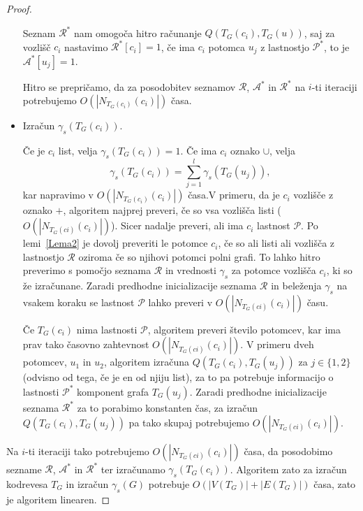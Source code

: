 \documentclass[12pt,a4paper,twoside]{article}
\theoremstyle{definition} %
\theoremstyle{plain} %
\numberwithin{equation}{section}  %
\begin{document}
\begin{proof}
\begin{itemize}
Seznam $\mathcal{R^*}$ nam omogoča hitro računanje $Q(T_G(c_i), T_G(u))$, saj za vozlišč $c_i$ nastavimo $\mathcal{R^*}[c_i] = 1$, če ima $c_i$ potomca $u_j$ z lastnostjo $\mathcal{P^*}$, to je $\mathcal{A^*}[u_j] = 1$.

Hitro se prepričamo, da za posodobitev seznamov $\mathcal{R}$, $\mathcal{A^*}$ in $\mathcal{R^*}$ na $i$-ti iteraciji potrebujemo $O(|N_{T_G(c_i)}(c_i)|)$ časa.

\item Izračun $\gamma_s(T_G(c_i))$.

Če je $c_i$ list, velja $\gamma_s(T_G(c_i)) = 1$. Če ima $c_i$ oznako $\cup$, velja $$\gamma_s(T_G(c_i)) = \sum\limits_{j=1}^l \gamma_s(T_G(u_j)),$$ kar napravimo v $O(|N_{T_G(c_i)}(c_i)|)$ časa.V primeru, da je $c_i$ vozlišče z oznako $+$, algoritem najprej preveri, če so vsa vozlišča listi ($O(|N_{T_G(ci)}(c_i)|)$). Sicer nadalje preveri, ali ima $c_i$ lastnost $\mathcal{P}$. Po lemi~\ref{Lema2} je dovolj preveriti le potomce $c_i$, če so ali listi ali vozlišča z lastnostjo $\mathcal{R}$ oziroma če so njihovi potomci polni grafi. To lahko hitro preverimo s pomočjo seznama $\mathcal{R}$ in vrednosti $\gamma_s$ za potomce vozlišča $c_i$, ki so že izračunane. Zaradi predhodne inicializacije seznama $\mathcal{R}$ in beleženja $\gamma_s$ na vsakem koraku se lastnost $\mathcal{P}$ lahko preveri v $O(|N_{T_G(ci)}(c_i)|)$ času.

Če $T_G(c_i)$ nima lastnosti $\mathcal{P}$, algoritem preveri število potomcev, kar ima prav tako časovno zahtevnost $O(|N_{T_G(ci)}(c_i)|)$. V primeru dveh potomcev, $u_1$ in $u_2$, algoritem izračuna $Q(T_G(c_i), T_G(u_j))$ za $j \in \{1, 2\}$ (odvisno od tega, če je en od njiju list), za to pa potrebuje informacijo o lastnosti $\mathcal{P^*}$ komponent grafa $T_G(u_j)$. Zaradi predhodne inicializacije seznama $\mathcal{R^*}$ za to porabimo konstanten čas, za izračun $Q(T_G(c_i), T_G(u_j))$ pa tako skupaj potrebujemo  $O(|N_{T_G(ci)}(c_i)|)$. 
\end{itemize}
Na $i$-ti iteraciji tako potrebujemo $O(|N_{T_G(ci)}(c_i)|)$ časa, da posodobimo sezname $\mathcal{R}$, $\mathcal{A^*}$ in $\mathcal{R^*}$ ter izračunamo $\gamma_s(T_G(c_i))$. Algoritem zato za izračun kodrevesa $T_G$ in izračun $\gamma_s(G)$  potrebuje $O(|V(T_G)| + |E(T_G)|)$ časa, zato je algoritem linearen.
\end{proof}
\end{document}
